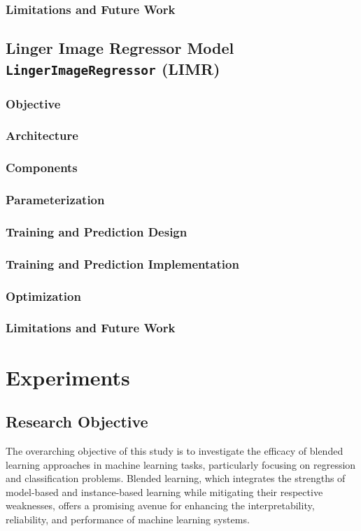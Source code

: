 \documentclass[a4paper, 12pt]{report}
\begin{document}
\subsection{Limitations and Future Work}
\section{Linger Image Regressor Model \texttt{LingerImageRegressor} (LIMR)}
\label{sec:lingerImage_Regressor_model}
\subsection{Objective}
\subsection{Architecture}
\subsection{Components}
\subsection{Parameterization}
\subsection{Training and Prediction Design}
\subsection{Training and Prediction Implementation}
\subsection{Optimization}
\subsection{Limitations and Future Work}

\chapter{Experiments}
\label{ch:Experiments}

\section{Research Objective}

The overarching objective of this study is to investigate the efficacy of blended learning approaches in machine learning tasks, 
particularly focusing on regression and classification problems. Blended learning, which integrates the strengths of model-based and instance-based learning while mitigating their respective weaknesses, 
offers a promising avenue for enhancing the interpretability, reliability, and performance of machine learning systems.
\end{document}
